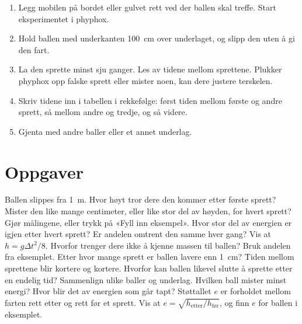 \documentclass[11pt]{article}
\begin{document}
\begin{enumerate}
\item Legg mobilen på bordet eller gulvet rett ved der ballen skal treffe. Start eksperimentet i phyphox.
\item Hold ballen med underkanten 100~cm over underlaget, og slipp den uten å gi den fart.
\item La den sprette minst sju ganger. Les av tidene mellom sprettene. Plukker phyphox opp falske sprett eller mister noen, kan dere justere terskelen.
\item Skriv tidene inn i tabellen i rekkefølge: først tiden mellom første og andre sprett, så mellom andre og tredje, og så videre.
\item Gjenta med andre baller eller et annet underlag.
\end{enumerate}

\section*{Oppgaver}

\begin{oppgaveliste}
\oppgave {}Ballen slippes fra 1~m. Hvor høyt tror dere den kommer etter første sprett? Mister den like mange centimeter, eller like stor del av høyden, for hvert sprett?
\svar
\oppgave {}Gjør målingene, eller trykk på «Fyll inn eksempel». Hvor stor del av energien er igjen etter hvert sprett? Er andelen omtrent den samme hver gang?
\svar
\oppgave {}Vis at $h = gΔt^{2}/8$. Hvorfor trenger dere ikke å kjenne massen til ballen?
\svar
\oppgave {}Bruk andelen fra eksemplet. Etter hvor mange sprett er ballen lavere enn 1~cm? Tiden mellom sprettene blir kortere og kortere. Hvorfor kan ballen likevel slutte å sprette etter en endelig tid?
\svar
\oppgave {}Sammenlign ulike baller og underlag. Hvilken ball mister minst energi? Hvor blir det av energien som går tapt?
\svar
\oppgave {}Støttallet $e$ er forholdet mellom farten rett etter og rett før et sprett. Vis at $e = \sqrt{h_{\mathrm{etter}}/h_{\mathrm{før}}}$, og finn $e$ for ballen i eksemplet.
\svar
\end{oppgaveliste}
\end{document}
